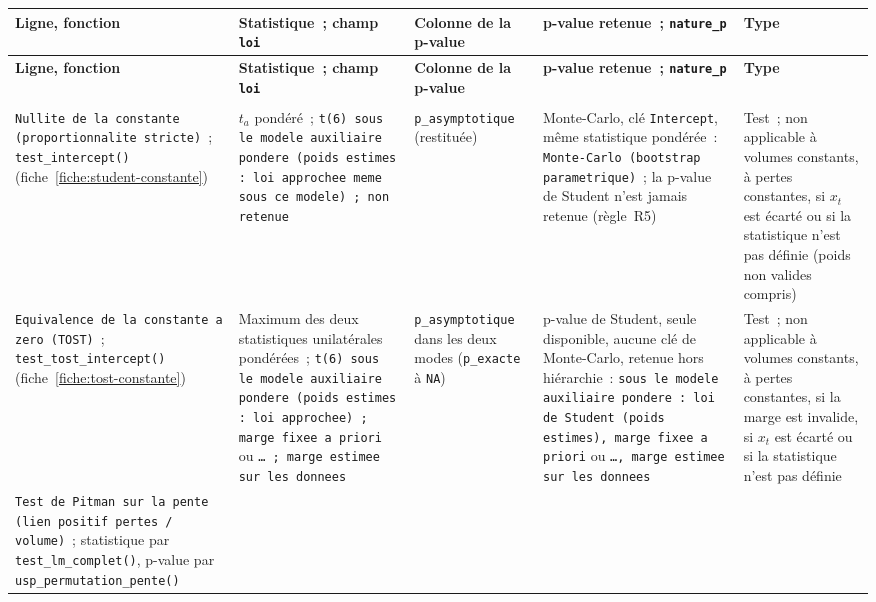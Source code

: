 \documentclass[a4paper,11pt]{article}
\newcommand{\code}[1]{\texttt{\small #1}}
\begin{document}
\begin{center}
\scriptsize
\setlength{\tabcolsep}{2pt}
\renewcommand{\arraystretch}{1.15}
\begin{longtable}{@{}>{\raggedright\arraybackslash}p{3.3cm}>{\raggedright\arraybackslash}p{3.5cm}>{\raggedright\arraybackslash}p{2.7cm}>{\raggedright\arraybackslash}p{3.7cm}>{\raggedright\arraybackslash}p{2.0cm}@{}}
\toprule
\textbf{Ligne, fonction} & \textbf{Statistique~; champ \code{loi}} & \textbf{Colonne de la p-value} &
\textbf{p-value retenue~; \code{nature\_p}} & \textbf{Type} \\
\midrule
\endfirsthead
\toprule
\textbf{Ligne, fonction} & \textbf{Statistique~; champ \code{loi}} & \textbf{Colonne de la p-value} &
\textbf{p-value retenue~; \code{nature\_p}} & \textbf{Type} \\
\midrule
\endhead
\multicolumn{5}{@{}l@{}}{\textit{Suite page suivante}} \\
\endfoot
\bottomrule
\endlastfoot
\code{Nullite de la constante (proportionnalite stricte)}~; \code{test\_intercept()}
(fiche~\ref{fiche:student-constante}) &
$t_a$ pondéré~; \code{t(6) sous le modele auxiliaire pondere (poids estimes : loi approchee
meme sous ce modele) ; non retenue} &
\code{p\_asymptotique} (restituée) &
Monte-Carlo, clé \code{Intercept}, même statistique pondérée~: \code{Monte-Carlo (bootstrap
parametrique)}~; la p-value de Student n'est jamais retenue (règle~R5) &
Test~; non applicable à volumes constants, à pertes constantes, si $x_t$ est écarté ou si la
statistique n'est pas définie (poids non valides compris) \\
\code{Equivalence de la constante a zero (TOST)}~; \code{test\_tost\_}\allowbreak\code{intercept()}
(fiche~\ref{fiche:tost-constante}) &
Maximum des deux statistiques unilatérales pondérées~; \code{t(6) sous le modele auxiliaire
pondere (poids estimes : loi approchee) ; marge fixee a priori} ou \code{\dots{} ; marge estimee
sur les donnees} &
\code{p\_asymptotique} dans les deux modes (\code{p\_exacte} à \code{NA}) &
p-value de Student, seule disponible, aucune clé de Monte-Carlo, retenue hors hiérarchie~:
\code{sous le modele auxiliaire pondere : loi de Student (poids estimes), marge fixee a priori} ou
\code{\dots{}, marge estimee sur les donnees} &
Test~; non applicable à volumes constants, à pertes constantes, si la marge est invalide, si
$x_t$ est écarté ou si la statistique n'est pas définie \\
\code{Test de Pitman sur la pente (lien positif pertes / volume)}~; statistique par
\code{test\_lm\_complet()}, p-value par \code{usp\_permutation\_}\allowbreak\code{pente()}

\end{longtable}
\end{center}
\end{document}
